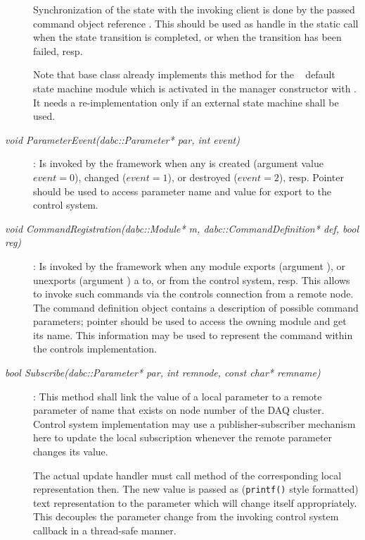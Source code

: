 \begin{description}
Synchronization of the state with the invoking client is done by
the passed command object reference . 
This should be used as handle in the static call  when the state transition is completed, or  when the transition has been failed, resp.

Note that base class  already implements this method for the 
\dabc~ default state machine module which is activated in the
manager constructor with . It needs a re-implementation only if
an external state machine shall be used.



\item[\em void ParameterEvent(dabc::Parameter* par, int event)] :
Is invoked by the framework when any  is created 
(argument value $event=0$),  changed ($event=1$),
or destroyed ($event=2$), resp. Pointer  should be used to access parameter
name and value for export to the control system. 


\item[\em void CommandRegistration(dabc::Module* m, dabc::CommandDefinition* def, bool reg)] :
Is invoked by the framework when any module exports (argument  ), or
unexports (argument  ) a 
to, or from the control system, resp. This allows to invoke such 
commands via the controls connection from a remote node. 
The command definition object 
contains a description of possible command parameters; 
pointer  should be used to access the owning module and
get its name. This information may be used to represent the command within
the controls implementation.




\item[\em bool Subscribe(dabc::Parameter* par, int remnode, 
const char* remname)] :
This method shall link the value of a local parameter  to a remote parameter
of name  that exists on node number  of the DAQ
cluster. Control system implementation may use a publisher-subscriber mechanism here
to update the local subscription whenever the remote parameter changes its value.

The actual update handler must call method 
of the corresponding local representation  then.
The new value  is passed as ({\tt printf()} style formatted) 
text representation to the parameter which 
will change itself appropriately. This decouples the parameter change
from the invoking control system callback in a thread-safe manner.


\end{description}
